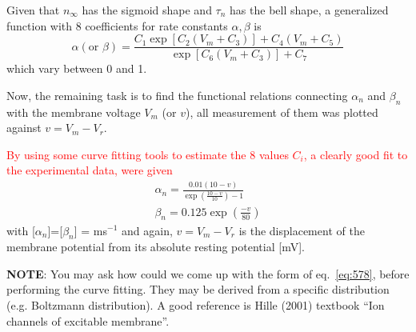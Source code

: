 

\begin{mdframed}
  Given that $n_\infty$ has the sigmoid shape and $\tau_n$ has the bell
  shape, a generalized function with 8 coefficients for rate constants
  $\alpha, \beta$ is
  \begin{equation}
    \label{eq:578}
    \alpha (\text{or } \beta) = \frac{C_1 \exp [C_2(V_m + C_3)] +C_4(V_m
    +C_5)}{\exp [C_6(V_m +C_3)] + C_7}
  \end{equation}
  which vary between 0 and 1.
\end{mdframed}



Now, the remaining task is to find the functional relations connecting
$\alpha_n$ and $\beta_n$ with the membrane voltage $V_m$ (or $v$), all
measurement of them was plotted against $v=V_m-V_r$.  %


\textcolor{red}{ By using some curve fitting tools to estimate the
  8 values $C_i$, a clearly good fit to the experimental data, were
  given}
\begin{equation}
  \label{eq:64}
  \begin{split}
      \alpha_n = \frac{0.01 (10-v)}{\exp(\frac{10-v}{10}) - 1}
      \\
      \beta_n = 0.125 \exp(\frac{-v}{80})
  \end{split}
\end{equation}
with [$\alpha_n$]=[$\beta_n$] = ms$^{-1}$ and again, $v=V_m-V_r$ is
the displacement of the membrane potential from its absolute resting
potential [mV].

{\bf NOTE}: You may ask how could we come up with the form of
eq.~\eqref{eq:578}, before performing the curve fitting. They may be
derived from a specific distribution (e.g. Boltzmann distribution). A
good reference is Hille (2001) textbook ``Ion channels of excitable
membrane''.

